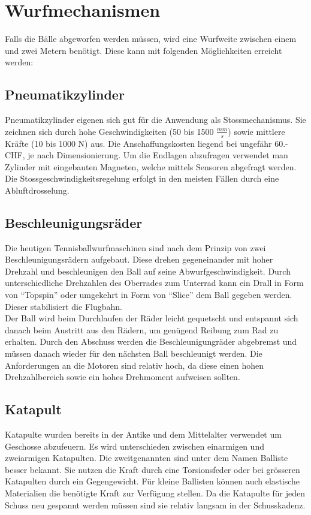 ﻿\section{Wurfmechanismen}
Falls die Bälle abgeworfen werden müssen, wird eine Wurfweite zwischen einem und zwei Metern benötigt. Diese kann mit folgenden Möglichkeiten erreicht werden:

\subsection{Pneumatikzylinder}
Pneumatikzylinder eigenen sich gut für die Anwendung als Stossmechanismus. Sie zeichnen sich durch hohe Geschwindigkeiten (50 bis 1500 $\frac{mm}{s}$) sowie mittlere Kräfte (10 bis 1000 N) aus. Die Anschaffungskosten liegend bei ungefähr 60.- CHF, je nach Dimensionierung. Um die Endlagen abzufragen verwendet man Zylinder mit eingebauten Magneten, welche mittels Sensoren abgefragt werden. Die Stossgeschwindigkeitsregelung erfolgt in den meisten Fällen durch eine Abluftdrosselung.

\subsection{Beschleunigungsräder}
Die heutigen Tennisballwurfmaschinen sind nach dem Prinzip von zwei Beschleunigungsrädern aufgebaut. Diese drehen gegeneinander mit hoher Drehzahl und beschleunigen den Ball auf seine Abwurfgeschwindigkeit. Durch unterschiedliche Drehzahlen des Oberrades zum Unterrad kann ein Drall in Form von \enquote{Topspin} oder umgekehrt in Form von \enquote{Slice} dem Ball gegeben werden. Dieser stabilisiert die Flugbahn.\\
Der Ball wird beim Durchlaufen der Räder leicht gequetscht und entspannt sich danach beim Austritt aus den Rädern, um genügend Reibung zum Rad zu erhalten. Durch den Abschuss werden die Beschleunigungräder abgebremst und müssen danach wieder für den nächsten Ball beschleunigt werden. Die Anforderungen an die Motoren sind relativ hoch, da diese einen hohen Drehzahlbereich sowie ein hohes Drehmoment aufweisen sollten.

\subsection{Katapult}
Katapulte wurden bereits in der Antike und dem Mittelalter verwendet um Geschosse abzufeuern. Es wird unterschieden zwischen einarmigen und zweiarmigen Katapulten. Die zweitgenannten sind unter dem Namen Balliste besser bekannt. Sie nutzen die Kraft durch eine Torsionsfeder oder bei grösseren Katapulten durch ein Gegengewicht. Für kleine Ballisten können auch elastische Materialien die benötigte Kraft zur Verfügung stellen. Da die Katapulte für jeden Schuss neu gespannt werden müssen sind sie relativ langsam in der Schusskadenz. 

